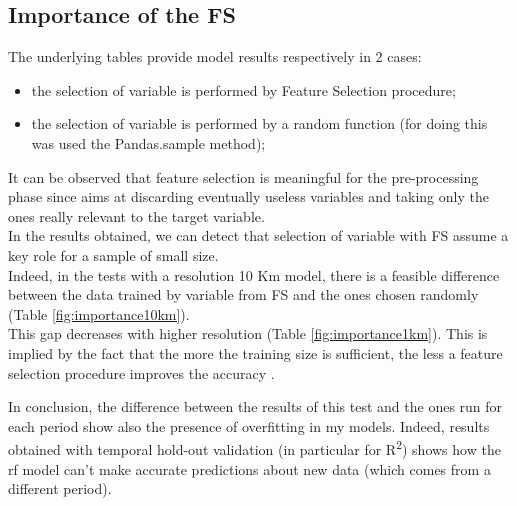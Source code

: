 \subsection{Importance of the FS}
The underlying tables provide model results respectively in 2 cases:
\begin{itemize}
    \item the selection of variable is performed by Feature Selection procedure;
    \item the selection of variable is performed by a random function (for doing this was used the Pandas.sample method);
\end{itemize}
It can be observed that feature selection is meaningful for the pre-processing phase since aims at discarding eventually useless variables and taking only the ones really relevant to the target variable. \\
In the results obtained, we can detect that selection of variable with FS assume a key role for a sample of small size.\\ 
Indeed, in the tests with a resolution 10 Km model, there is a feasible difference between the data trained by variable from FS and the ones chosen randomly (Table \ref{fig:importance10km}). \\
This gap decreases with higher resolution (Table \ref{fig:importance1km}).
This is implied by the fact that the more the training size is sufficient, the less a feature selection procedure improves the accuracy \cite{chu2012does}.
\par
In conclusion, the difference between the results of this test and the ones run for each period show also the presence of overfitting in my models. Indeed, results obtained with temporal hold-out validation (in particular for  R\textsuperscript{2}) shows how the \acrshort{rf} model can't make accurate predictions about new data (which comes from a different period).  

